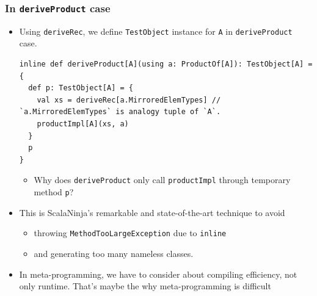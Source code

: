\begin{frame}[fragile]
  \frametitle{ In \lstinline|deriveProduct| case}
  
  \begin{itemize}
    \item Using \lstinline|deriveRec|, we define \lstinline|TestObject| instance for \lstinline|A|
    in \lstinline|deriveProduct| case.
\begin{lstlisting}[style=scala]
inline def deriveProduct[A](using a: ProductOf[A]): TestObject[A] = {
  def p: TestObject[A] = {
    val xs = deriveRec[a.MirroredElemTypes] // `a.MirroredElemTypes` is analogy tuple of `A`.
    productImpl[A](xs, a)
  }
  p
}
\end{lstlisting}
    \begin{itemize}
      \item Why does \lstinline|deriveProduct| only call \lstinline|productImpl|
      through temporary method \lstinline|p|?
    \end{itemize}

    \item This is ScalaNinja's remarkable and state-of-the-art technique to
    avoid
    \begin{itemize}
      \item throwing \lstinline|MethodTooLargeException| due to \lstinline|inline|
      \item and generating too many nameless classes.
    \end{itemize}

    \item In meta-programming, we have to consider about compiling efficiency, not only runtime.
    That's maybe the why meta-programming is difficult
  \end{itemize}

\end{frame}

